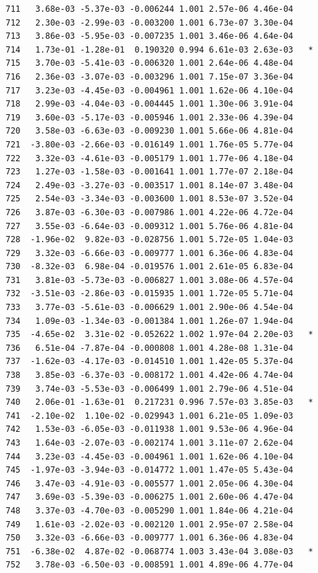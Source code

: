 \documentclass[
  letterpaper,
  DIV=11,
  numbers=noendperiod]{scrartcl}
\begin{document}
\begin{verbatim}
711   3.68e-03 -5.37e-03 -0.006244 1.001 2.57e-06 4.46e-04    
712   2.30e-03 -2.99e-03 -0.003200 1.001 6.73e-07 3.30e-04    
713   3.86e-03 -5.95e-03 -0.007235 1.001 3.46e-06 4.64e-04    
714   1.73e-01 -1.28e-01  0.190320 0.994 6.61e-03 2.63e-03   *
715   3.70e-03 -5.41e-03 -0.006320 1.001 2.64e-06 4.48e-04    
716   2.36e-03 -3.07e-03 -0.003296 1.001 7.15e-07 3.36e-04    
717   3.23e-03 -4.45e-03 -0.004961 1.001 1.62e-06 4.10e-04    
718   2.99e-03 -4.04e-03 -0.004445 1.001 1.30e-06 3.91e-04    
719   3.60e-03 -5.17e-03 -0.005946 1.001 2.33e-06 4.39e-04    
720   3.58e-03 -6.63e-03 -0.009230 1.001 5.66e-06 4.81e-04    
721  -3.80e-03 -2.66e-03 -0.016149 1.001 1.76e-05 5.77e-04    
722   3.32e-03 -4.61e-03 -0.005179 1.001 1.77e-06 4.18e-04    
723   1.27e-03 -1.58e-03 -0.001641 1.001 1.77e-07 2.18e-04    
724   2.49e-03 -3.27e-03 -0.003517 1.001 8.14e-07 3.48e-04    
725   2.54e-03 -3.34e-03 -0.003600 1.001 8.53e-07 3.52e-04    
726   3.87e-03 -6.30e-03 -0.007986 1.001 4.22e-06 4.72e-04    
727   3.55e-03 -6.64e-03 -0.009312 1.001 5.76e-06 4.81e-04    
728  -1.96e-02  9.82e-03 -0.028756 1.001 5.72e-05 1.04e-03    
729   3.32e-03 -6.66e-03 -0.009777 1.001 6.36e-06 4.83e-04    
730  -8.32e-03  6.98e-04 -0.019576 1.001 2.61e-05 6.83e-04    
731   3.81e-03 -5.73e-03 -0.006827 1.001 3.08e-06 4.57e-04    
732  -3.51e-03 -2.86e-03 -0.015935 1.001 1.72e-05 5.71e-04    
733   3.77e-03 -5.61e-03 -0.006629 1.001 2.90e-06 4.54e-04    
734   1.09e-03 -1.34e-03 -0.001384 1.001 1.26e-07 1.94e-04    
735  -4.65e-02  3.31e-02 -0.052622 1.002 1.97e-04 2.20e-03   *
736   6.51e-04 -7.87e-04 -0.000808 1.001 4.28e-08 1.31e-04    
737  -1.62e-03 -4.17e-03 -0.014510 1.001 1.42e-05 5.37e-04    
738   3.85e-03 -6.37e-03 -0.008172 1.001 4.42e-06 4.74e-04    
739   3.74e-03 -5.53e-03 -0.006499 1.001 2.79e-06 4.51e-04    
740   2.06e-01 -1.63e-01  0.217231 0.996 7.57e-03 3.85e-03   *
741  -2.10e-02  1.10e-02 -0.029943 1.001 6.21e-05 1.09e-03    
742   1.53e-03 -6.05e-03 -0.011938 1.001 9.53e-06 4.96e-04    
743   1.64e-03 -2.07e-03 -0.002174 1.001 3.11e-07 2.62e-04    
744   3.23e-03 -4.45e-03 -0.004961 1.001 1.62e-06 4.10e-04    
745  -1.97e-03 -3.94e-03 -0.014772 1.001 1.47e-05 5.43e-04    
746   3.47e-03 -4.91e-03 -0.005577 1.001 2.05e-06 4.30e-04    
747   3.69e-03 -5.39e-03 -0.006275 1.001 2.60e-06 4.47e-04    
748   3.37e-03 -4.70e-03 -0.005290 1.001 1.84e-06 4.21e-04    
749   1.61e-03 -2.02e-03 -0.002120 1.001 2.95e-07 2.58e-04    
750   3.32e-03 -6.66e-03 -0.009777 1.001 6.36e-06 4.83e-04    
751  -6.38e-02  4.87e-02 -0.068774 1.003 3.43e-04 3.08e-03   *
752   3.78e-03 -6.50e-03 -0.008591 1.001 4.89e-06 4.77e-04    

\end{verbatim}
\end{document}
